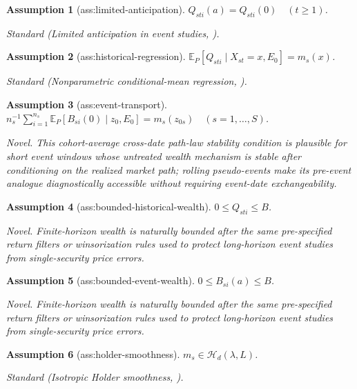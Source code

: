 \documentclass{article}
\newtheorem{assumption}{Assumption}
\begin{document}
\begin{assumption}[ass:limited-anticipation]\label{ass:limited-anticipation}
\(Q_{sti}(a)=Q_{sti}(0)\quad(t\ge1)\).
\par\smallskip\noindent\emph{Standard} (Limited anticipation in event studies, \cite{GoldsmithPinkhamLyu2025}).
\end{assumption}

\begin{assumption}[ass:historical-regression]\label{ass:historical-regression}
\(\mathbb E_P[Q_{sti}\mid X_{st}=x,E_0]=m_s(x)\).
\par\smallskip\noindent\emph{Standard} (Nonparametric conditional-mean regression, \cite{Gaiffas2007}).
\end{assumption}

\begin{assumption}[ass:event-transport]\label{ass:event-transport}
\(n_s^{-1}\sum_{i=1}^{n_s}\mathbb E_P[B_{si}(0)\mid z_0,E_0]=m_s(z_{0s})\quad(s=1,\ldots,S)\).
\par\smallskip\noindent\emph{Novel.} This cohort-average cross-date path-law stability condition is plausible for short event windows whose untreated wealth mechanism is stable after conditioning on the realized market path; rolling pseudo-events make its pre-event analogue diagnostically accessible without requiring event-date exchangeability.
\end{assumption}

\begin{assumption}[ass:bounded-historical-wealth]\label{ass:bounded-historical-wealth}
\(0\le Q_{sti}\le B\).
\par\smallskip\noindent\emph{Novel.} Finite-horizon wealth is naturally bounded after the same pre-specified return filters or winsorization rules used to protect long-horizon event studies from single-security price errors.
\end{assumption}

\begin{assumption}[ass:bounded-event-wealth]\label{ass:bounded-event-wealth}
\(0\le B_{si}(a)\le B\).
\par\smallskip\noindent\emph{Novel.} Finite-horizon wealth is naturally bounded after the same pre-specified return filters or winsorization rules used to protect long-horizon event studies from single-security price errors.
\end{assumption}

\begin{assumption}[ass:holder-smoothness]\label{ass:holder-smoothness}
\(m_s\in\mathcal H_d(\lambda,L)\).
\par\smallskip\noindent\emph{Standard} (Isotropic Holder smoothness, \cite{Gaiffas2007}).
\end{assumption}
\end{document}
